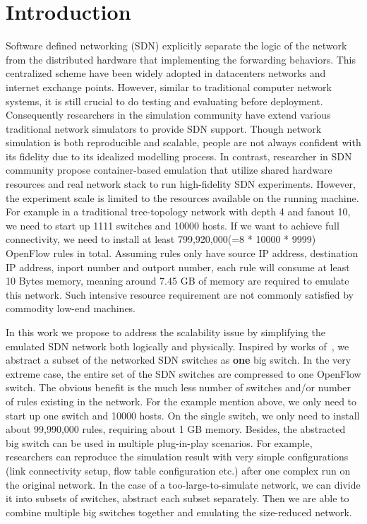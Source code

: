 \section{Introduction}

Software defined networking (SDN) explicitly separate the logic of the network
from the distributed hardware that implementing the forwarding behaviors.
This centralized scheme have been widely adopted in datacenters networks
and internet exchange points\cite{B4, Meridian, SDX}.
However, similar to traditional computer network systems, it is still crucial to do testing
and evaluating before deployment.
Consequently researchers in the simulation community have extend various
traditional network simulators to provide SDN support\cite{S3F, NS3, OPNET}.
Though network simulation is both reproducible and scalable,
people are not always confident with its fidelity due to its idealized modelling process.
In contrast, researcher in SDN community propose container-based emulation that utilize
shared hardware resources and real network stack to run high-fidelity SDN experiments\cite{Mininet}.
However, the experiment scale is limited to the resources available on the running machine.
For example in a traditional tree-topology network with depth 4 and fanout 10,
we need to start up 1111 switches and 10000 hosts.
If we want to achieve full connectivity, we need to install at least 799,920,000(=8 * 10000 * 9999)
OpenFlow rules in total.
Assuming rules only have source IP address, destination IP address, inport number and outport number,
each rule will consume at least 10 Bytes memory, meaning around 7.45 GB of memory are required to
emulate this network.
Such intensive resource requirement are not commonly satisfied by commodity low-end machines.

In this work we propose to address the scalability issue by simplifying the emulated
SDN network both logically and physically.
Inspired by works of~\cite{OneBigSwitchAbstraction, Veriflow},
we abstract a subset of the networked SDN switches as \textbf{one} big switch.
In the very extreme case, the entire set of the SDN switches are compressed to
one OpenFlow switch.
The obvious benefit is the much less number of switches and/or number of rules existing in the network.
For the example mention above, we only need to start up one switch and 10000 hosts.
On the single switch, we only need to install about 99,990,000 rules, requiring about 1 GB memory.
Besides, the abstracted big switch can be used in multiple plug-in-play scenarios.
For example, researchers can reproduce the simulation result with very
simple configurations (link connectivity setup, flow table configuration etc.)
after one complex run on the original network.
In the case of a too-large-to-simulate network, we can divide it into subsets of switches,
abstract each subset separately.
Then we are able to combine multiple big switches together and emulating the size-reduced network.


